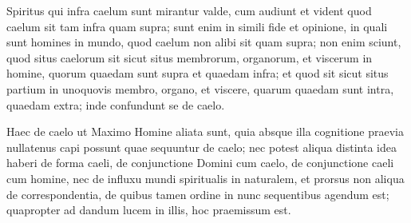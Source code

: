 \begin{topic}{66}
    Spiritus qui infra caelum sunt mirantur valde, cum audiunt et vident quod caelum sit tam infra quam supra; sunt enim
    in simili fide et opinione, in quali sunt homines in mundo, quod caelum non alibi sit quam supra; non enim sciunt,
    quod situs caelorum sit sicut situs membrorum, organorum, et viscerum in homine, quorum quaedam sunt supra et
    quaedam infra; et quod sit sicut situs partium in unoquovis membro, organo, et viscere, quarum quaedam sunt intra,
    quaedam extra; inde confundunt se de caelo.
\end{topic}

\begin{topic}{67}
    Haec de caelo ut Maximo Homine aliata sunt, quia absque illa cognitione praevia nullatenus capi possunt quae
    sequuntur de caelo; nec potest aliqua distinta idea haberi de forma caeli, de conjunctione Domini cum caelo, de
    conjunctione caeli cum homine, nec de influxu mundi spiritualis in naturalem, et prorsus non aliqua de
    correspondentia, de quibus tamen ordine in nunc sequentibus agendum est; quapropter ad dandum lucem in illis, hoc
    praemissum est.
\end{topic}
